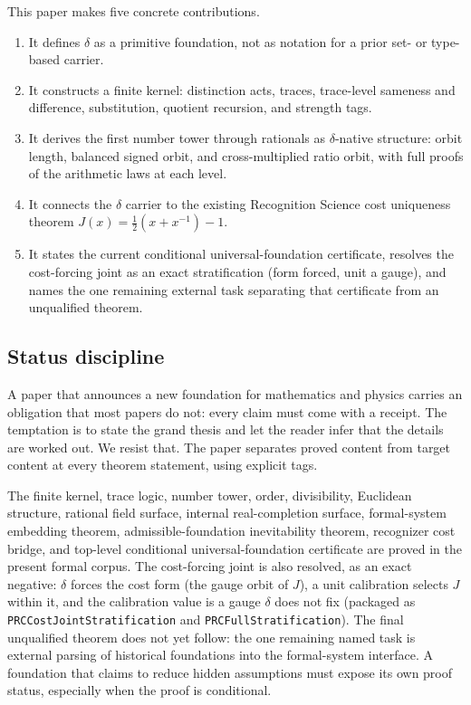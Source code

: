 \documentclass[11pt,a4paper]{article}
\theoremstyle{definition}
\theoremstyle{remark}
\begin{document}
This paper makes five concrete contributions.
\begin{enumerate}[leftmargin=2em]
  \item It defines $\delta$ as a primitive foundation, not as notation for a
    prior set- or type-based carrier.
  \item It constructs a finite kernel: distinction acts, traces, trace-level
    sameness and difference, substitution, quotient recursion, and strength
    tags.
  \item It derives the first number tower through rationals as $\delta$-native
    structure: orbit length, balanced signed orbit, and cross-multiplied ratio
    orbit, with full proofs of the arithmetic laws at each level.
  \item It connects the $\delta$ carrier to the existing Recognition Science
    cost uniqueness theorem $J(x) = \tfrac{1}{2}(x + x^{-1}) - 1$.
  \item It states the current conditional universal-foundation certificate,
    resolves the cost-forcing joint as an exact stratification (form forced,
    unit a gauge), and names the one remaining external task separating that
    certificate from an unqualified theorem.
\end{enumerate}

\subsection{Status discipline}

A paper that announces a new foundation for mathematics and physics carries an
obligation that most papers do not: every claim must come with a receipt. The
temptation is to state the grand thesis and let the reader infer that the
details are worked out. We resist that. The paper separates proved content from
target content at every theorem statement, using explicit tags.

The finite kernel, trace logic, number tower, order, divisibility, Euclidean
structure, rational field surface, internal real-completion surface,
formal-system embedding theorem, admissible-foundation inevitability theorem,
recognizer cost bridge, and top-level conditional universal-foundation
certificate are proved in the present formal corpus. The cost-forcing joint is
also resolved, as an exact negative: $\delta$ forces the cost form (the gauge
orbit of $J$), a unit calibration selects $J$ within it, and the calibration
value is a gauge $\delta$ does not fix
(packaged as \texttt{PRCCostJointStratification} and
\texttt{PRCFullStratification}). The final unqualified theorem does not yet
follow: the one remaining named task is external parsing of historical
foundations into the formal-system interface. A foundation that claims to reduce
hidden assumptions must expose its own proof status, especially when the proof is
conditional.
\end{document}

